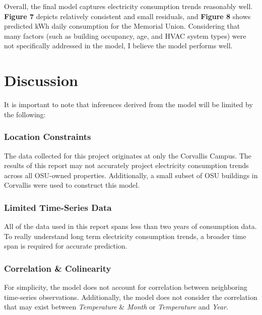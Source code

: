 \documentclass[
]{article}
\begin{document}
Overall, the final model captures electricity consumption trends
reasonably well. \textbf{Figure 7} depicts relatively consistent and
small residuals, and \textbf{Figure 8} shows predicted kWh daily
consumption for the Memorial Union. Considering that many factors (such
as building occupancy, age, and HVAC system types) were not specifically
addressed in the model, I believe the model performs well.

\hypertarget{discussion}{%
\section{Discussion}\label{discussion}}

It is important to note that inferences derived from the model will be
limited by the following:

\hypertarget{location-constraints}{%
\subsubsection{Location Constraints}\label{location-constraints}}

The data collected for this project originates at only the Corvallis
Campus. The results of this report may not accurately project
electricity consumption trends across all OSU-owned properties.
Additionally, a small subset of OSU buildings in Corvallis were used to
construct this model.

\hypertarget{limited-time-series-data}{%
\subsubsection{Limited Time-Series
Data}\label{limited-time-series-data}}

All of the data used in this report spans less than two years of
consumption data. To really understand long term electricity consumption
trends, a broader time span is required for accurate prediction.

\hypertarget{correlation-colinearity}{%
\subsubsection{Correlation \&
Colinearity}\label{correlation-colinearity}}

For simplicity, the model does not account for correlation between
neighboring time-series observations. Additionally, the model does not
consider the correlation that may exist between \emph{Temperature} \&
\emph{Month} or \emph{Temperature} and \emph{Year}.
\end{document}
